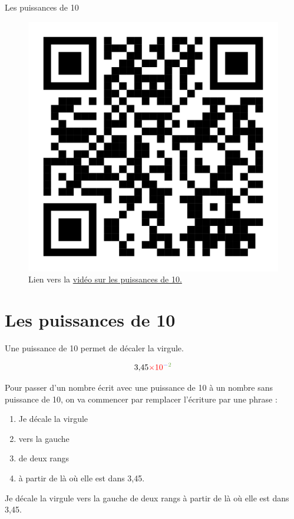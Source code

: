 \documentclass[12pt,a4paper]{article}
\begin{document}
\begin{header}
Les puissances de 10
\end{header}

\begin{figure}[h]
\center
\includegraphics[scale=0.05]{images/qr_puissance_de_10.png}
\caption{Lien vers la \href{https://youtu.be/Rn91_g60EsI}{vidéo sur les puissances de 10.}}
\end{figure}

\section*{Les puissances de 10}

\begin{definition}
Une puissance de 10 permet de décaler la virgule.
\end{definition}

\begin{Huge}
\[
\textcolor{black}{3{,}45} \textcolor{red}{\times 10} ^ { \textcolor{blue}{-} \textcolor{green_f}{2} }
\]
\end{Huge}

Pour passer d'un nombre écrit avec une puissance de 10 à un nombre sans puissance de 10, on va commencer par remplacer l'écriture par une phrase :
\begin{enumerate}
\color{red}
\item Je décale la virgule
\color{blue}
\item vers la gauche
\color{green_f}
\item de deux rangs
\color{black}
\item à partir de là où elle est dans 3{,}45.
\end{enumerate}
\og Je décale la virgule vers la gauche de deux rangs à partir de là où elle est dans 3{,}45. \fg{}
\end{document}
